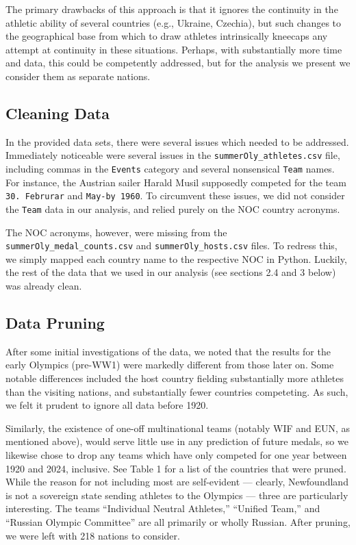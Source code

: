 \documentclass[12pt]{article}
\begin{document}
The primary drawbacks of this approach is that it ignores the continuity in the athletic ability of several countries (e.g., Ukraine, Czechia), but such changes to the geographical base from which to draw athletes intrinsically kneecaps any attempt at continuity in these situations. 
Perhaps, with substantially more time and data, this could be competently addressed, but for the analysis we present we consider them as separate nations.


\subsection{Cleaning Data}
In the provided data sets, there were several issues which needed to be addressed.
Immediately noticeable were several issues in the \verb|summerOly_athletes.csv| file, including commas in the \verb|Events| category and several nonsensical \verb|Team| names. 
For instance, the Austrian sailer Harald Musil supposedly competed for the team \verb|30. Februrar| and \verb|May-by 1960|. 
To circumvent these issues, we did not consider the \verb|Team| data in our analysis, and relied purely on the NOC country acronyms.

The NOC acronyms, however, were missing from the \verb|summerOly_medal_counts.csv| and \verb|summerOly_hosts.csv| files. 
To redress this, we simply mapped each country name to the respective NOC in Python. 
Luckily, the rest of the data that we used in our analysis (see sections 2.4 and 3 below) was already clean.

\subsection{Data Pruning}
After some initial investigations of the data, we noted that the results for the early Olympics (pre-WW1) were markedly different from those later on.
Some notable differences included the host country fielding substantially more athletes than the visiting nations, and substantially fewer countries competeting.
As such, we felt it prudent to ignore all data before 1920.

Similarly, the existence of one-off multinational teams (notably WIF and EUN, as mentioned above), would serve little use in any prediction of future medals, so we likewise chose to drop any teams which have only competed for one year between 1920 and 2024, inclusive.
See Table 1 for a list of the countries that were pruned. 
While the reason for not including most are self-evident — clearly, Newfoundland is not a sovereign state sending athletes to the Olympics — three are particularly interesting.
The teams ``Individual Neutral Athletes,'' ``Unified Team,'' and ``Russian Olympic Committee'' are all primarily or wholly Russian. After pruning, we were left with 218 nations to consider. 
\end{document}
